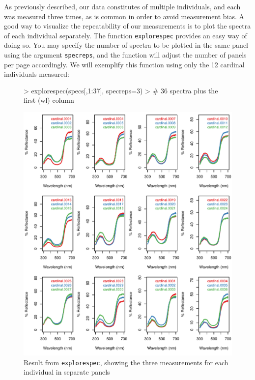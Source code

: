 \documentclass{article}
\newcommand{\code}[1]{{\tt #1}}  %
\begin{document}
As previously described, our data constitutes of multiple individuals, and each was measured 
three times, as is common in order to avoid measurement bias. A good way to visualize the 
repeatability of our measurements is to plot the spectra of each individual separately. The 
function \code{explorespec} provides an easy way of doing so. You may specify the number of 
spectra to be plotted in the same panel using the argument \code{specreps}, and the function 
will adjust the number of panels per page accordingly. We will exemplify this function using 
only the 12 cardinal individuals measured:

\begin{figure}[H] %
\begin{center}
\begin{Schunk}
\begin{Sinput}
> explorespec(specs[,1:37], specreps=3) 
> # 36 spectra plus the first (wl) column
\end{Sinput}
\end{Schunk}
\includegraphics{pavo-explorespecfig}
\end{center}
\caption{Result from \code{explorespec}, showing the three measurements for each individual in separate panels}
\label{figure:explorespec}
\end{figure}
\end{document}
